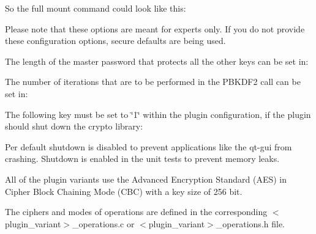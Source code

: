 So the full mount command could look like this\+:


\begin{DoxyCode}{0}
\end{DoxyCode}


Please note that these options are meant for experts only. If you do not provide these configuration options, secure defaults are being used.

The length of the master password that protects all the other keys can be set in\+:


\begin{DoxyCode}{0}
\end{DoxyCode}


The number of iterations that are to be performed in the P\+B\+K\+D\+F2 call can be set in\+:


\begin{DoxyCode}{0}
\end{DoxyCode}


The following key must be set to {\ttfamily \char`\"{}1\char`\"{}} within the plugin configuration, if the plugin should shut down the crypto library\+:


\begin{DoxyCode}{0}
\end{DoxyCode}


Per default shutdown is disabled to prevent applications like the qt-\/gui from crashing. Shutdown is enabled in the unit tests to prevent memory leaks.

All of the plugin variants use the Advanced Encryption Standard (A\+ES) in Cipher Block Chaining Mode (C\+BC) with a key size of 256 bit.

The ciphers and modes of operations are defined in the corresponding {\ttfamily $<$plugin\+\_\+variant$>$\+\_\+operations.\+c} or {\ttfamily $<$plugin\+\_\+variant$>$\+\_\+operations.\+h} file. 